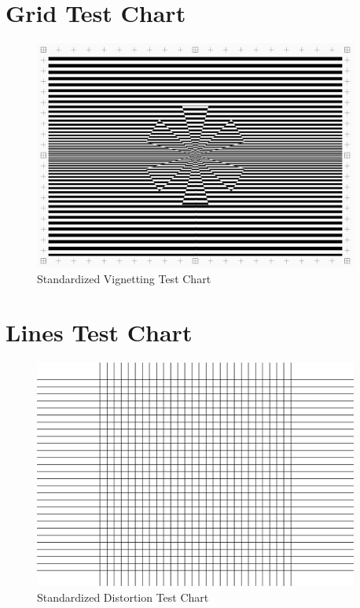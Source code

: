 \section{Grid Test Chart}
\label{app:vignetting_chart}
\begin{figure}[H]
    \centering
    \includegraphics[angle=90,width=0.95\textwidth]{Images/calibration.png}
    \caption{Standardized Vignetting Test Chart}
    \label{fig:vignetting_chart}
\end{figure}

\section{Lines Test Chart}
\label{app:distortion_chart}
\begin{figure}[H]
    \centering
    \includegraphics[angle=90,width=0.95\textwidth]{Images/grid.png}
    \caption{Standardized Distortion Test Chart}
    \label{fig:distortion_chart}
\end{figure}

